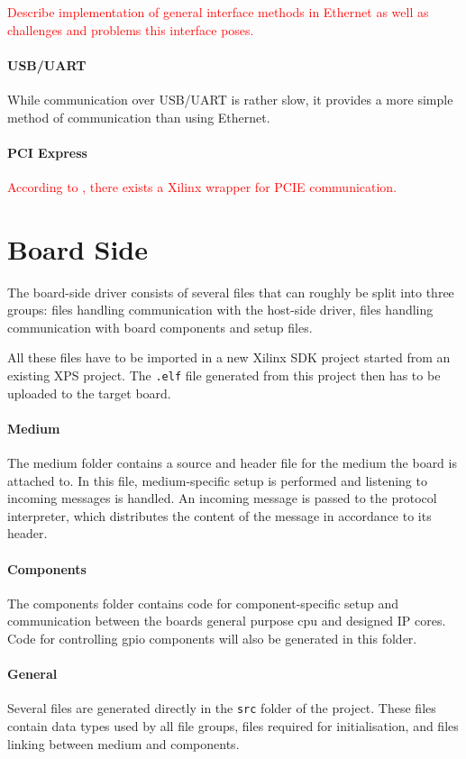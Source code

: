 \documentclass{report}
\begin{document}
\textcolor{red}{Describe implementation of general interface methods in Ethernet as well as challenges and problems this interface poses.}

\paragraph{USB/UART}
While communication over USB/UART is rather slow, it provides a more simple method of communication than using Ethernet. 

\paragraph{PCI Express}
\textcolor{red}{According to \cite{alachiotis10}, there exists a Xilinx wrapper for PCIE communication.}

\newpage
\section{Board Side}
The board-side driver consists of several files that can roughly be split into three groups: files handling communication with the host-side driver, files handling communication with board components and setup files.

All these files have to be imported in a new Xilinx SDK project started from an existing XPS project. The \texttt{.elf} file generated from this project then has to be uploaded to the target board.

\paragraph{Medium}
The medium folder contains a source and header file for the medium the board is attached to. In this file, medium-specific setup is performed and listening to incoming messages is handled. An incoming message is passed to the protocol interpreter, which distributes the content of the message in accordance to its header.

\paragraph{Components}
The components folder contains code for component-specific setup and communication between the boards general purpose cpu and designed IP cores. Code for controlling gpio components will also be generated in this folder.

\paragraph{General}
Several files are generated directly in the \texttt{src} folder of the project. These files contain data types used by all file groups, files required for initialisation, and files linking between medium and components. 
\end{document}
